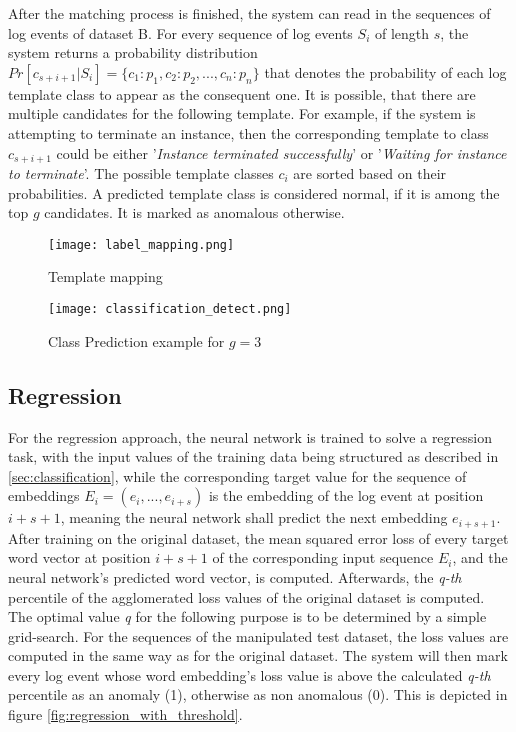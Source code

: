 After the matching process is finished, the system can read in the sequences of log events of dataset B. For every sequence of log events $S_i$ of length $s$, the system returns a probability distribution $Pr[c_{s+i+1}|S_i] = \{c_1 : p_1, c_2 : p_2, ..., c_n : p_n\}$ that denotes the probability of each log template class to appear as the consequent one. It is possible, that there are multiple candidates for the following template. For example, if the system is attempting to terminate an instance, then the corresponding template to class $c_{s+i+1}$ could be either '\textit{Instance terminated successfully}' or '\textit{Waiting for instance to terminate}'. The possible template classes $c_i$ are sorted based on their probabilities. A predicted template class is considered normal, if it is among the top $g$ candidates. It is marked as anomalous otherwise.
 

\begin{figure}[H]
	\centering
	\captionsetup{justification=centering}
	\texttt{[image: label\_mapping.png]}
	\caption{Template mapping}
	\label{fig:label_mapping}
\end{figure}

\begin{figure}[H]
	\centering	
	\texttt{[image: classification\_detect.png]}
	\caption{Class Prediction example for $g=3$}
	\label{fig:class_prediction}
\end{figure}

\subsection{Regression \label{sec:regression}}
For the regression approach, the neural network is trained to solve a regression task, with the input values of the training data being structured as described in \ref{sec:classification}, while the corresponding target value for the sequence of embeddings $E_i = (e_i, ..., e_{i+s})$ is the embedding of the log event at position $i+s+1$, meaning the neural network shall predict the next embedding $e_{i+s+1}$. After training on the original dataset, the mean squared error loss of every target word vector at position $i+s+1$ of the corresponding input sequence $E_i$, and the neural network's predicted word vector, is computed. Afterwards, the \textit{q-th} percentile of the agglomerated loss values of the original dataset is computed. The optimal value \textit{q} for the following purpose is to be determined by a simple grid-search. For the sequences of the manipulated test dataset, the loss values are computed in the same way as for the original dataset. The system will then mark every log event whose word embedding's loss value is above the calculated \textit{q-th} percentile as an anomaly (1), otherwise as non anomalous (0). This is depicted in figure \ref{fig:regression_with_threshold}.

